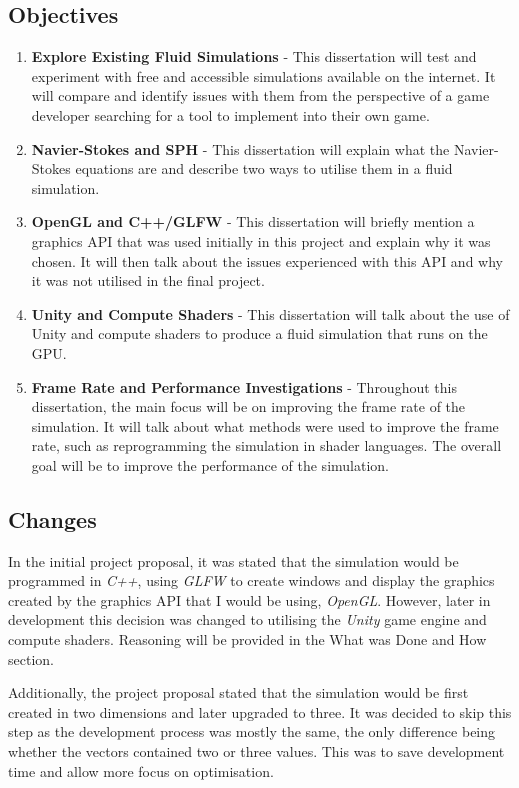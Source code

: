 \documentclass[12pt]{article}
\begin{document}
    \subsection{Objectives}
    \begin{enumerate}
        \item \textbf{Explore Existing Fluid Simulations} - This dissertation will test and experiment with free and accessible simulations available on the internet. It will compare and identify issues with them from the perspective of a game developer searching for a tool to implement into their own game.
        \item \textbf{Navier-Stokes and SPH} - This dissertation will explain what the Navier-Stokes equations are and describe two ways to utilise them in a fluid simulation.
        \item \textbf{OpenGL and C++/GLFW} - This dissertation will briefly mention a graphics API that was used initially in this project and explain why it was chosen. It will then talk about the issues experienced with this API and why it was not utilised in the final project.
        \item \textbf{Unity and Compute Shaders} - This dissertation will talk about the use of Unity and compute shaders to produce a fluid simulation that runs on the GPU.
        \item \textbf{Frame Rate and Performance Investigations} - Throughout this dissertation, the main focus will be on improving the frame rate of the simulation. It will talk about what methods were used to improve the frame rate, such as reprogramming the simulation in shader languages. The overall goal will be to improve the performance of the simulation.
    \end{enumerate}

    \subsection{Changes}
    In the initial project proposal, it was stated that the simulation would be programmed in \textit{C++}, using \textit{GLFW}\cite{glfw} to create windows and display the graphics created by the graphics API that I would be using, \textit{OpenGL}\cite{opengl}. However, later in development this decision was changed to utilising the \textit{Unity} game engine\cite{unity} and compute shaders. Reasoning will be provided in the What was Done and How section.

    Additionally, the project proposal stated that the simulation would be first created in two dimensions and later upgraded to three. It was decided to skip this step as the development process was mostly the same, the only difference being whether the vectors contained two or three values. This was to save development time and allow more focus on optimisation.
\end{document}
